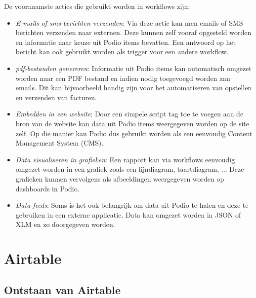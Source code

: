 De voornaamste acties die gebruikt worden in workflows zijn;
\begin{itemize}
    \item \textit{E-mails of sms-berichten verzenden}: Via deze actie kan men emails of SMS berichten verzenden naar externen. Deze kunnen zelf vooraf opgesteld worden en informatie naar keuze uit Podio items bevatten. Een antwoord op het bericht kan ook gebruikt worden als trigger voor een andere workflow. \autocite{PodioWorkflowFeatures}
    \item \textit{pdf-bestanden genereren}: Informatie uit Podio items kan automatisch omgezet worden naar een PDF bestand en indien nodig toegevoegd worden aan emails. Dit kan bijvoorbeeld handig zijn voor het automatiseren van opstellen en verzenden van facturen. \autocite{PodioWorkflowFeatures}
    \item \textit{Embedden in een website}: Door een simpele script tag toe te voegen aan de bron van de website kan data uit Podio items weergegeven worden op de site zelf. Op die manier kan Podio dus gebruikt worden als een eenvoudig Content Management System (CMS). \autocite{PodioWorkflowFeatures}
    \item \textit{Data visualiseren in grafieken}: Een rapport kan via workflows eenvoudig omgezet worden in een grafiek zoals een lijndiagram, taartdiagram, ... Deze grafieken kunnen vervolgens als afbeeldingen weergegeven worden op dashboards in Podio. \autocite{PodioWorkflowFeatures}
    \item \textit{Data feeds}: Soms is het ook belangrijk om data uit Podio te halen en deze te gebruiken in een externe applicatie. Data kan omgezet worden in JSON of XLM en zo doorgegeven worden. \autocite{PodioWorkflowFeatures}
\end{itemize}

\section{Airtable}
\label{sec:airtable}


\subsection{Ontstaan van Airtable}
\label{subsec:ontstaan_airtable}


